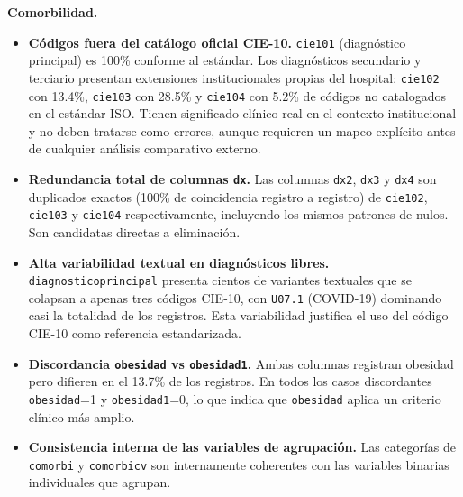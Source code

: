 \textbf{Comorbilidad.}
\begin{itemize}
    \item \textbf{Códigos fuera del catálogo oficial CIE-10.} \texttt{cie101} (diagnóstico principal) es 100\% conforme al estándar. Los diagnósticos secundario y terciario presentan extensiones institucionales propias del hospital: \texttt{cie102} con 13.4\%, \texttt{cie103} con 28.5\% y \texttt{cie104} con 5.2\% de códigos no catalogados en el estándar ISO. Tienen significado clínico real en el contexto institucional y no deben tratarse como errores, aunque requieren un mapeo explícito antes de cualquier análisis comparativo externo.

    \item \textbf{Redundancia total de columnas \texttt{dx}.} Las columnas \texttt{dx2}, \texttt{dx3} y \texttt{dx4} son duplicados exactos (100\% de coincidencia registro a registro) de \texttt{cie102}, \texttt{cie103} y \texttt{cie104} respectivamente, incluyendo los mismos patrones de nulos. Son candidatas directas a eliminación.

    \item \textbf{Alta variabilidad textual en diagnósticos libres.} \texttt{diagnosticoprincipal} presenta cientos de variantes textuales que se colapsan a apenas tres códigos CIE-10, con \texttt{U07.1} (COVID-19) dominando casi la totalidad de los registros. Esta variabilidad justifica el uso del código CIE-10 como referencia estandarizada.

    \item \textbf{Discordancia \texttt{obesidad} vs \texttt{obesidad1}.} Ambas columnas registran obesidad pero difieren en el 13.7\% de los registros. En todos los casos discordantes \texttt{obesidad}=1 y \texttt{obesidad1}=0, lo que indica que \texttt{obesidad} aplica un criterio clínico más amplio.

    \item \textbf{Consistencia interna de las variables de agrupación.} Las categorías de \texttt{comorbi} y \texttt{comorbicv} son internamente coherentes con las variables binarias individuales que agrupan.
\end{itemize}

